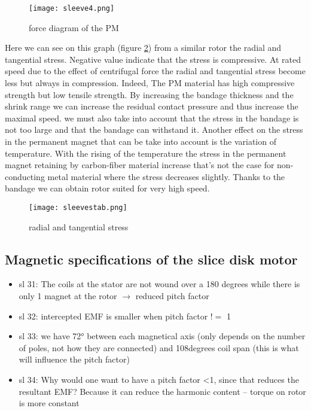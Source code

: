 \begin{figure}[H]
    \centering
    \texttt{[image: sleeve4.png]}
    \caption{force diagram of the PM}
    \label{forcediag}
\end{figure}




Here we can see on this graph (figure \ref{radandtang}) from a similar rotor the radial and tangential stress. Negative value indicate that the stress is compressive.
At rated speed due to the effect of centrifugal force the radial and tangential stress become less but always in compression. Indeed, The PM material has high compressive strength but low tensile strength.
By increasing the bandage thickness and the shrink range we can increase the residual contact pressure and thus increase the maximal speed. we must also take into account that the stress in the bandage is not too large and that the bandage can withstand it.
Another effect on the stress in the permanent magnet that can be take into account is the variation of temperature. With the rising of the temperature the stress in the permanent magnet retaining by carbon-fiber material increase that’s not the case for non-conducting metal material where the stress decreases slightly.
Thanks to the bandage we can obtain rotor suited for very high speed.

\begin{figure}[H]
    \centering
    \texttt{[image: sleevestab.png]}
    \caption{radial and tangential stress}
    \label{radandtang}
\end{figure}


\subsection{Magnetic specifications of the slice disk motor}

\begin{itemize}
    \item sl 31: The coils at the stator are not wound over a 180 degrees while there is only 1 magnet at the rotor $\rightarrow$ reduced pitch factor 
    \item sl 32: intercepted EMF is smaller when pitch factor $!=$ 1
    \item sl 33: we have 72° between each magnetical axis (only depends on the number of poles, not how they are connected) and 108degrees coil span (this is what will influence the pitch factor) 
    \item sl 34: Why would one want to have a pitch factor <1, since that reduces the resultant EMF? Because it can reduce the harmonic content -- torque on rotor is more constant
\end{itemize}

